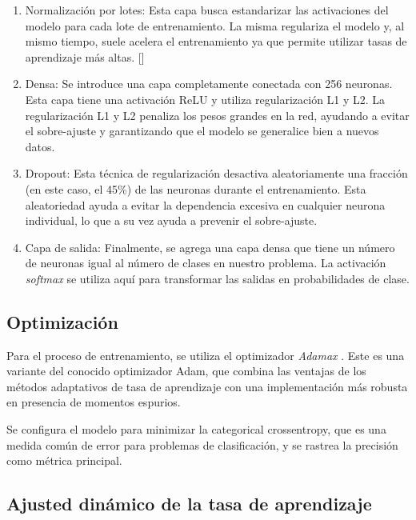 \begin{enumerate}
   \item Normalización por lotes: Esta capa busca estandarizar las activaciones del modelo para cada lote de entrenamiento. 
   La misma regulariza el modelo y, al mismo tiempo, suele acelera el entrenamiento ya que permite utilizar tasas de aprendizaje más altas. [\cite{regularization}]

   \item Densa: Se introduce una capa completamente conectada con 256 neuronas. Esta capa tiene una activación ReLU y utiliza regularización L1 y L2.
   La regularización L1 y L2 penaliza los pesos grandes en la red, ayudando a evitar el sobre-ajuste y garantizando que el modelo se generalice
    bien a nuevos datos. \cite{dense}
   
   \item Dropout: Esta técnica de regularización desactiva aleatoriamente una fracción (en este caso, el 45\%) de las neuronas durante el 
   entrenamiento. Esta aleatoriedad ayuda a evitar la dependencia excesiva en cualquier neurona individual, lo que a su vez ayuda a prevenir
    el sobre-ajuste. \cite{dropout}
   
   \item Capa de salida: Finalmente, se agrega una capa densa que tiene un número de neuronas igual al número de clases en nuestro problema. 
   La activación \textit{softmax} se utiliza aquí para transformar las salidas en probabilidades de clase.

\end{enumerate}

\subsection{Optimización}

Para el proceso de entrenamiento, se utiliza el optimizador \textit{Adamax} \cite{adamax}. Este es una variante del conocido optimizador Adam, que combina las ventajas de los métodos adaptativos de tasa de aprendizaje con una implementación más robusta en presencia de momentos espurios. 

Se configura el modelo para minimizar la categorical crossentropy, que es una medida común de error para problemas de clasificación, y se rastrea la precisión como métrica principal.

\subsection{Ajusted dinámico de la tasa de aprendizaje}


